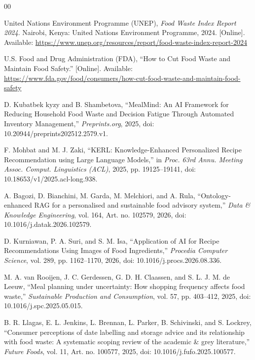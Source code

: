 \begin{thebibliography}{00}

 United Nations Environment Programme (UNEP), \textit{Food Waste Index Report 2024}. Nairobi, Kenya: United Nations Environment Programme, 2024. [Online]. Available: \url{https://www.unep.org/resources/report/food-waste-index-report-2024}

 U.S. Food and Drug Administration (FDA), ``How to Cut Food Waste and Maintain Food Safety.'' [Online]. Available: \url{https://www.fda.gov/food/consumers/how-cut-food-waste-and-maintain-food-safety}

 D. Kubatbek kyzy and B. Shambetova, ``MealMind: An AI Framework for Reducing Household Food Waste and Decision Fatigue Through Automated Inventory Management,'' \textit{Preprints.org}, 2025, doi: 10.20944/preprints202512.2579.v1.

 F. Mohbat and M. J. Zaki, ``KERL: Knowledge-Enhanced Personalized Recipe Recommendation using Large Language Models,'' in \textit{Proc. 63rd Annu. Meeting Assoc. Comput. Linguistics (ACL)}, 2025, pp. 19125--19141, doi: 10.18653/v1/2025.acl-long.938.

 A. Bagozi, D. Bianchini, M. Garda, M. Melchiori, and A. Rula, ``Ontology-enhanced RAG for a personalised and sustainable food advisory system,'' \textit{Data \& Knowledge Engineering}, vol. 164, Art. no. 102579, 2026, doi: 10.1016/j.datak.2026.102579.

 D. Kurniawan, P. A. Suri, and S. M. Isa, ``Application of AI for Recipe Recommendations Using Images of Food Ingredients,'' \textit{Procedia Computer Science}, vol. 289, pp. 1162--1170, 2026, doi: 10.1016/j.procs.2026.08.336.

 M. A. van Rooijen, J. C. Gerdessen, G. D. H. Claassen, and S. L. J. M. de Leeuw, ``Meal planning under uncertainty: How shopping frequency affects food waste,'' \textit{Sustainable Production and Consumption}, vol. 57, pp. 403--412, 2025, doi: 10.1016/j.spc.2025.05.015.

 B. R. Llagas, E. L. Jenkins, L. Brennan, L. Parker, B. Schivinski, and S. Lockrey, ``Consumer perceptions of date labelling and storage advice and its relationship with food waste: A systematic scoping review of the academic \& grey literature,'' \textit{Future Foods}, vol. 11, Art. no. 100577, 2025, doi: 10.1016/j.fufo.2025.100577.


\end{thebibliography}
